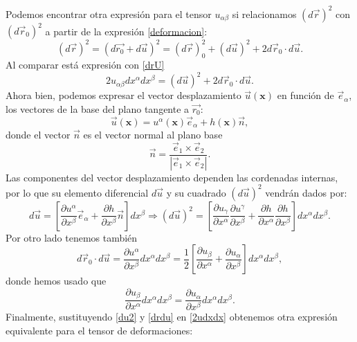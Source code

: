 Podemos encontrar otra expresión para el tensor $u_{\alpha\beta}$ si
relacionamos $(d\vec{r})^2$ con $(d\vec{r}_0)^2$ a partir de
la expresión \eqref{deformacion}:
\begin{equation}\label{dl_vectorial}
(d\vec{r})^2=(d\vec{r_0}+d\vec{u})^2=(d\vec{r})^2_0+(d\vec{u})^2+2d\vec{r}_0\cdot d\vec{u}.
\end{equation}
Al comparar está expresión con \eqref{drU}
\begin{equation}\label{2udxdx}
2u_{\alpha\beta}dx^{\alpha}dx^{\beta}=(d\vec{u})^2+2d\vec{r}_0\cdot d\vec{u}.
\end{equation}
Ahora bien, podemos expresar el vector desplazamiento $\vec{u}(\mathbf{x})$ en función de
$\vec{e}_{\alpha}$, los vectores de la base del plano tangente a $\vec{r_0}$:
\begin{equation*}
  \vec{u}(\mathbf{x})=u^{\alpha}(\mathbf{x})\vec{e}_{\alpha}+h(\mathbf{x})\vec{n},
\end{equation*}
donde el vector $\vec{n}$ es el vector normal al plano base
\begin{equation}
\vec{n}=\frac{\vec{e}_1\times \vec{e}_2}{|\vec{e}_1\times \vec{e}_2|}.
\end{equation}
Las componentes del vector desplazamiento dependen las cordenadas internas, por lo que su elemento
diferencial $d\vec{u}$ y su cuadrado $(d\vec{u})^2$ vendrán dados por: 
\begin{equation}\label{du2}
d\vec{u}=\left[\frac{\partial
  u^{\alpha}}{\partial x^{\beta}}\vec{e}_{\alpha}+\frac{\partial
  h}{\partial x^{\beta}} \vec{n}\right]dx^{\beta}\Rightarrow
(d\vec{u})^2=\left[
\frac{\partial u_{\gamma}}{\partial x^{\alpha}}
\frac{\partial u^{\gamma}}{\partial x^{\beta}}+ 
\frac{\partial h}{\partial x^{\alpha}}
\frac{\partial h}{\partial x^{\beta}}\right]
dx^{\alpha}dx^{\beta}.
\end{equation}
Por otro lado tenemos también
\begin{equation}\label{drdu}
d\vec{r}_0\cdot d\vec{u}=\frac{\partial u^{\alpha}}{\partial x^{\beta}}dx^{\alpha}dx^{\beta}=\frac{1}{2}\left[\frac{\partial u_{\beta}}{\partial x^{\alpha}}+ \frac{\partial u_{\alpha}}{\partial x^{\beta}}\right]dx^{\alpha}dx^{\beta},
\end{equation}
donde hemos usado que
 $$\frac{\partial u_{\beta}}{\partial
   x^{\alpha}}dx^{\alpha}dx^{\beta}=\frac{\partial u_{\alpha}}{\partial
   x^{\beta}}dx^{\alpha}dx^{\beta}.$$
Finalmente, sustituyendo \eqref{du2} y \eqref{drdu} en \eqref{2udxdx}
obtenemos otra expresión equivalente para el tensor de deformaciones:

